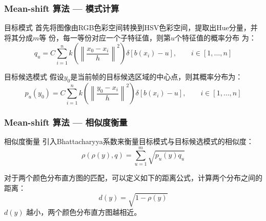 \documentclass[xcolor=svgnames,serif,table,10pt]{beamer}
\begin{document}
\iffalse
\begin{frame}
  \frametitle{Mean-shift 算法 --- 模式计算}
  \begin{block}{目标模式}
    首先将图像由RGB色彩空间转换到HSV色彩空间，提取出Hue分量，并将其分成$m$等
    份，每一等份对应一个子特征值，则第$u$个特征值的概率分布
    为\cite{duda1973pattern}：
\begin{equation}
  \label{eq:characteristic-prob}
  q_{u}=C\sum_{i=1}^{n}k\left( \left\| \frac{x_{0}-x_{i}}{h} \right\|^{2}
  \right)\delta[b(x_{i})-u],\qquad i\in[1,\ldots,n]
\end{equation}
\end{block}

\pause

\begin{block}{目标候选模式}
  假设$y_0$是当前帧的目标候选区域的中心点，则其概率分布为：
\begin{equation}
  \label{eq:target-candidate}
  p_{u}(y_0)=C\sum_{i=1}^{n}k\left( \left\| \frac{y_{0}-x_{i}}{h} \right\|^{2}
  \right)\delta[b(x_{i})-u],\qquad i\in[1,\ldots,n]
\end{equation}
\end{block}
\end{frame}

\begin{frame}
  \frametitle{Mean-shift 算法 --- 相似度衡量}
  \begin{block}{相似度衡量}
    引入Bhattacharyya系数来衡量目标模式与目标候选模式的相似度：
\begin{equation}
  \label{eq:Bhattacharyya}
  \rho(\rho(y),q)=\sum_{u=1}^{m}\sqrt{p_{u}(y)q_{u}}
\end{equation}

对于两个颜色分布直方图的匹配，可以定义如下的距离公式，计算两个分布之间的距离：
\begin{equation}
  \label{eq:distance}
  d(y)=\sqrt{1-\rho(y)}
\end{equation}
$d(y)$ 越小，两个颜色分布直方图越相近。
  \end{block}
\end{frame}
\end{document}
